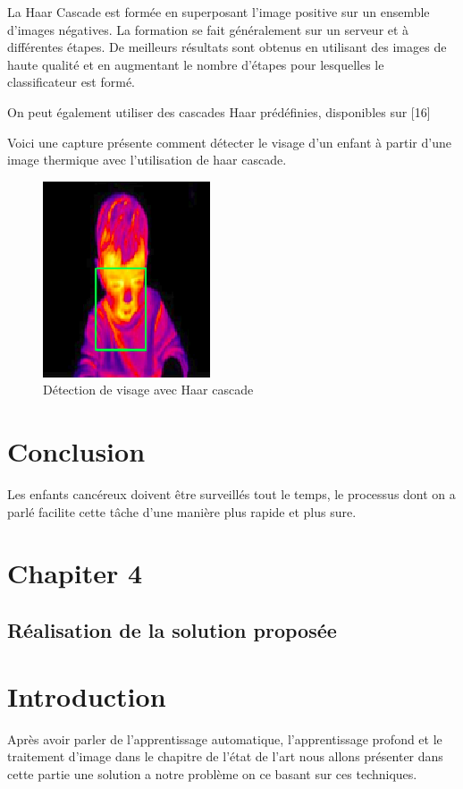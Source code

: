 \documentclass[12pt]{article}
\begin{document}
La Haar Cascade est formée en superposant l'image positive sur un ensemble d'images négatives. La formation se fait généralement sur un serveur et à différentes étapes. De meilleurs résultats sont obtenus en utilisant des images de haute qualité et en augmentant le nombre d'étapes pour lesquelles le classificateur est formé.

On peut également utiliser des cascades Haar prédéfinies, disponibles sur [16]

Voici une capture présente comment détecter le visage d'un enfant à partir d'une image thermique avec l'utilisation de haar cascade.

\begin{figure}[h]
	\centering
	\includegraphics[scale=1]{img-Chapiter-3/enfant.png}
	\caption{Détection de visage avec Haar cascade}
\end{figure}
\section{Conclusion}
Les enfants cancéreux doivent être surveillés tout le temps, le processus dont on a parlé facilite cette tâche d’une manière plus rapide et plus sure. 

\newpage
\rhead{}
\section*{\Huge{Chapiter 4}}
\subsection*{\huge{Réalisation de la solution proposée}}
\newpage
{}
\section{Introduction}
Après avoir parler de l’apprentissage automatique, l’apprentissage profond et le traitement d’image dans le chapitre de l’état de l’art nous allons présenter dans cette partie une solution a notre problème on ce basant sur ces techniques.
\end{document}
